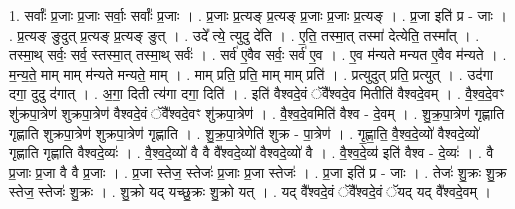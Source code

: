 \documentclass[17pt]{extarticle}
\begin{document}
1. सर्वाः᳚ प्र॒जाः प्र॒जाः सर्वाः॒ सर्वाः᳚ प्र॒जाः । . प्र॒जाः प्र॒त्यङ् प्र॒त्यङ् प्र॒जाः प्र॒जाः प्र॒त्यङ् । . प्र॒जा इति॑ प्र - जाः । . प्र॒त्यङ् ङुदुत् प्र॒त्यङ् प्र॒त्यङ् ङुत् । . उदे᳚ त्ये॒ त्युदु दे॑ति । . ए॒ति॒ तस्मा॒त् तस्मा॑ देत्येति॒ तस्मा᳚त् । . तस्मा॒थ् सर्वः॒ सर्व॒ स्तस्मा॒त् तस्मा॒थ् सर्वः॑ । . सर्व॑ ए॒वैव सर्वः॒ सर्व॑ ए॒व । . ए॒व म॑न्यते मन्यत ए॒वैव म॑न्यते । . म॒न्य॒ते॒ माम् माम् म॑न्यते मन्यते॒ माम् । . माम् प्रति॒ प्रति॒ माम् माम् प्रति॑ । . प्रत्युदुत् प्रति॒ प्रत्युत् । . उद॑गा दगा॒ दुदु द॑गात् । . अ॒गा॒ दिती त्य॑गा दगा॒ दिति॑ । . इति॑ वैश्वदे॒वं ॅवै᳚श्वदे॒व मितीति॑ वैश्वदे॒वम् । . वै॒श्व॒दे॒वꣳ शु॑क्रपा॒त्रेण॑ शुक्रपा॒त्रेण॑ वैश्वदे॒वं ॅवै᳚श्वदे॒वꣳ शु॑क्रपा॒त्रेण॑ । . वै॒श्व॒दे॒वमिति॑ वैश्व - दे॒वम् । . शु॒क्र॒पा॒त्रेण॑ गृह्णाति गृह्णाति शुक्रपा॒त्रेण॑ शुक्रपा॒त्रेण॑ गृह्णाति । . शु॒क्र॒पा॒त्रेणेति॑ शुक्र - पा॒त्रेण॑ । . गृ॒ह्णा॒ति॒ वै॒श्व॒दे॒व्यो॑ वैश्वदे॒व्यो॑ गृह्णाति गृह्णाति वैश्वदे॒व्यः॑ । . वै॒श्व॒दे॒व्यो॑ वै वै वै᳚श्वदे॒व्यो॑ वैश्वदे॒व्यो॑ वै । . वै॒श्व॒दे॒व्य॑ इति॑ वैश्व - दे॒व्यः॑ । . वै प्र॒जाः प्र॒जा वै वै प्र॒जाः । . प्र॒जा स्तेज॒ स्तेजः॑ प्र॒जाः प्र॒जा स्तेजः॑ । . प्र॒जा इति॑ प्र - जाः । . तेजः॑ शु॒क्रः शु॒क्र स्तेज॒ स्तेजः॑ शु॒क्रः । . शु॒क्रो यद् यच्छु॒क्रः शु॒क्रो यत् । . यद् वै᳚श्वदे॒वं ॅवै᳚श्वदे॒वं ॅयद् यद् वै᳚श्वदे॒वम् । \newline
\end{document}
